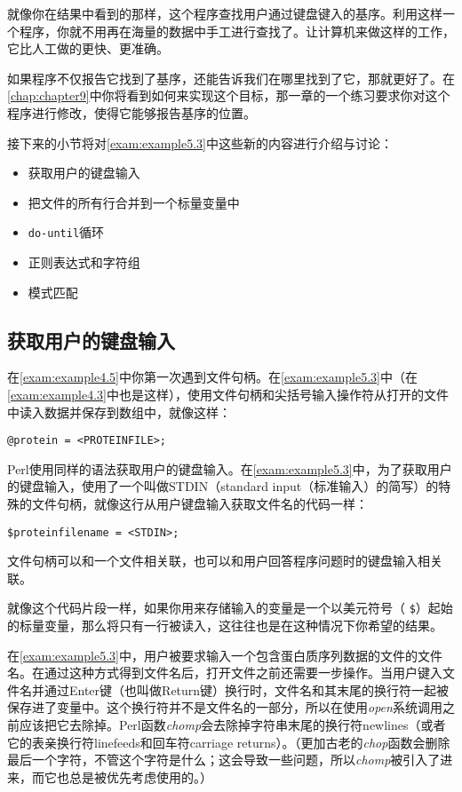 就像你在结果中看到的那样，这个程序查找用户通过键盘键入的基序。利用这样一个程序，你就不用再在海量的数据中手工进行查找了。让计算机来做这样的工作，它比人工做的更快、更准确。

如果程序不仅报告它找到了基序，还能告诉我们在哪里找到了它，那就更好了。在\autoref{chap:chapter9}中你将看到如何来实现这个目标，那一章的一个练习要求你对这个程序进行修改，使得它能够报告基序的位置。

接下来的小节将对\autoref{exam:example5.3}中这些新的内容进行介绍与讨论：

\begin{itemize}
  \item 获取用户的键盘输入
  \item 把文件的所有行合并到一个标量变量中
  \item  \verb|do-until|循环
  \item 正则表达式和字符组
  \item 模式匹配
\end{itemize}

\subsection{获取用户的键盘输入}
在\autoref{exam:example4.5}中你第一次遇到文件句柄。在\autoref{exam:example5.3}中（在\autoref{exam:example4.3}中也是这样），使用文件句柄和尖括号输入操作符从打开的文件中读入数据并保存到数组中，就像这样：

\begin{lstlisting}
@protein = <PROTEINFILE>;
\end{lstlisting}

Perl使用同样的语法获取用户的键盘输入。在\autoref{exam:example5.3}中，为了获取用户的键盘输入，使用了一个叫做STDIN（standard input（标准输入）的简写）的特殊的文件句柄，就像这行从用户键盘输入获取文件名的代码一样：

\begin{lstlisting}
$proteinfilename = <STDIN>;
\end{lstlisting}

文件句柄可以和一个文件相关联，也可以和用户回答程序问题时的键盘输入相关联。

就像这个代码片段一样，如果你用来存储输入的变量是一个以美元符号（ \verb|$|）起始的标量变量，那么将只有一行被读入，这往往也是在这种情况下你希望的结果。

在\autoref{exam:example5.3}中，用户被要求输入一个包含蛋白质序列数据的文件的文件名。在通过这种方式得到文件名后，打开文件之前还需要一步操作。当用户键入文件名并通过Enter键（也叫做Return键）换行时，文件名和其末尾的换行符一起被保存进了变量中。这个换行符并不是文件名的一部分，所以在使用\textit{open}系统调用之前应该把它去除掉。Perl函数\textit{chomp}会去除掉字符串末尾的换行符newlines（或者它的表亲换行符linefeeds和回车符carriage returns）。（更加古老的\textit{chop}函数会删除最后一个字符，不管这个字符是什么；这会导致一些问题，所以\textit{chomp}被引入了进来，而它也总是被优先考虑使用的。）

